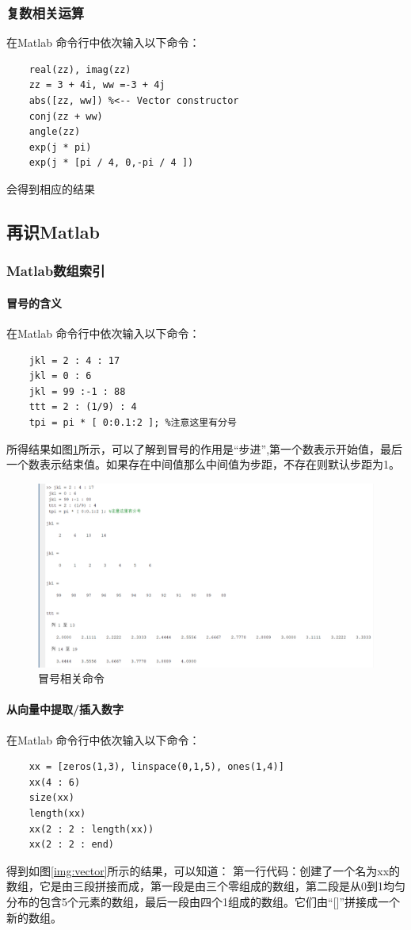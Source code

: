 \documentclass[UTF8]{ctexart}
\begin{document}
\subsubsection{复数相关运算}
在Matlab 命令行中依次输入以下命令：
\begin{verbatim}
    real(zz), imag(zz)
    zz = 3 + 4i, ww =-3 + 4j
    abs([zz, ww]) %<-- Vector constructor
    conj(zz + ww)
    angle(zz)
    exp(j * pi)
    exp(j * [pi / 4, 0,-pi / 4 ])
\end{verbatim}
会得到相应的结果
\subsection{再识Matlab}
\subsubsection{Matlab数组索引}
\paragraph{冒号的含义}
在Matlab 命令行中依次输入以下命令：
\begin{verbatim}
    jkl = 2 : 4 : 17
    jkl = 0 : 6
    jkl = 99 :-1 : 88
    ttt = 2 : (1/9) : 4
    tpi = pi * [ 0:0.1:2 ]; %注意这里有分号
\end{verbatim}
所得结果如图\ref{img:colon}所示，可以了解到冒号的作用是“步进”,第一个数表示开始值，最后一个数表示结束值。如果存在中间值那么中间值为步距，不存在则默认步距为1。
\begin{figure}[htbp]
    \centering
    \includegraphics[width=0.7\linewidth]{colon.png}
    \caption{冒号相关命令}
    \label{img:colon}
\end{figure}
\paragraph{从向量中提取/插入数字}
在Matlab 命令行中依次输入以下命令：
\begin{verbatim}
    xx = [zeros(1,3), linspace(0,1,5), ones(1,4)]
    xx(4 : 6)
    size(xx)
    length(xx)
    xx(2 : 2 : length(xx))
    xx(2 : 2 : end)
\end{verbatim}
得到如图\ref{img:vector}所示的结果，可以知道：
第一行代码：创建了一个名为xx的数组，它是由三段拼接而成，第一段是由三个零组成的数组，第二段是从0到1均匀分布的包含5个元素的数组，最后一段由四个1组成的数组。它们由“[]”拼接成一个新的数组。
\end{document}
